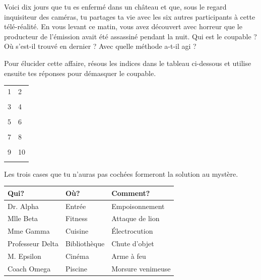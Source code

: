 


Voici dix jours que tu es enfermé dans un château et que, sous le regard inquisiteur des caméras, tu partages ta vie avec les six autres participants à cette télé-réalité. En vous levant ce matin, vous avez découvert avec horreur que le producteur de l'émission avait été assassiné pendant la nuit.  Qui est le coupable ? Où s'est-il trouvé en dernier ? Avec quelle méthode a-t-il agi ?

\vfill
Pour élucider cette affaire, résous les indices dans le tableau ci-dessous et utilise ensuite tes réponses pour démasquer le coupable.

\vfill
\begin{tabularx}{\linewidth}{|X|X|}
\hline
	1&2\\
	&\\[80pt]
\hline
	3&4\\
	&\\[80pt]
\hline
	5&6\\
	&\\[80pt]
\hline
	7&8\\
	&\\[80pt]
\hline
	9&10\\
	&\\[80pt]
\hline
\end{tabularx}

\newpage
Les trois cases que tu n'auras pas cochées formeront la solution au mystère.

\vspace{20pt}
\def\arraystretch{1.5}
\begin{tabularx}{\linewidth}{|X|X|X|}
\hline
	\textbf{Qui?}&\textbf{Où?}&\textbf{Comment?}\\
\hline
	Dr. Alpha \hfill\Box&Entrée \hfill\Box&Empoisonnement \hfill\Box\\
\hline
	Mlle Beta \hfill\Box&Fitness \hfill\Box&Attaque de lion \hfill\Box\\
\hline
	Mme Gamma \hfill\Box&Cuisine \hfill\Box&Électrocution \hfill\Box\\
\hline
	Professeur Delta \hfill\Box&Bibliothèque \hfill\Box&Chute d'objet \hfill\Box\\
\hline
	M. Epsilon \hfill\Box&Cinéma \hfill\Box&Arme à feu \hfill\Box\\
\hline
	Coach Omega \hfill\Box&Piscine \hfill\Box&Morsure venimeuse \hfill\Box\\
\hline
\end{tabularx}
\def\arraystretch{1}


